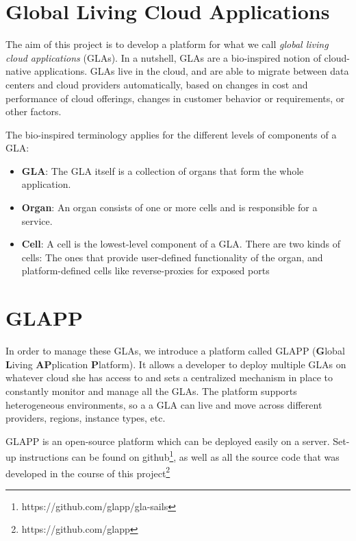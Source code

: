 \documentclass{seal_thesis}
\begin{document}
\section{Global Living Cloud Applications}

The aim of this project is to develop a platform for what we call \textit{global living cloud applications} (GLAs).
In a nutshell, GLAs are a bio-inspired notion of cloud-native applications.
GLAs live in the cloud, and are able to migrate between data centers and cloud providers automatically, based on changes in cost and performance of cloud offerings, changes in customer behavior or requirements, or other factors.

The bio-inspired terminology applies for the different levels of components of a GLA:

\begin{itemize}
	\item \textbf{GLA}: The GLA itself is a collection of organs that form the whole application.
	\item \textbf{Organ}: An organ consists of one or more cells and is responsible for a service.
	\item \textbf{Cell}: A cell is the lowest-level component of a GLA.
	There are two kinds of cells: The ones that provide user-defined functionality of the organ, and platform-defined cells like reverse-proxies for exposed ports
\end{itemize}


\section{GLAPP}

In order to manage these GLAs, we introduce a platform called GLAPP (\textbf{G}lobal \textbf{L}iving \textbf{AP}plication \textbf{P}latform).
It allows a developer to deploy multiple GLAs on whatever cloud she has access to and sets a centralized mechanism in place to constantly monitor and manage all the GLAs.
The platform supports heterogeneous environments, so a a GLA can live and move across different providers, regions, instance types, etc.

GLAPP is an open-source platform which can be deployed easily on a server. Set-up instructions can be found on github\footnote{https://github.com/glapp/gla-sails}, as well as all the source code that was developed in the course of this project\footnote{https://github.com/glapp}
\end{document}

